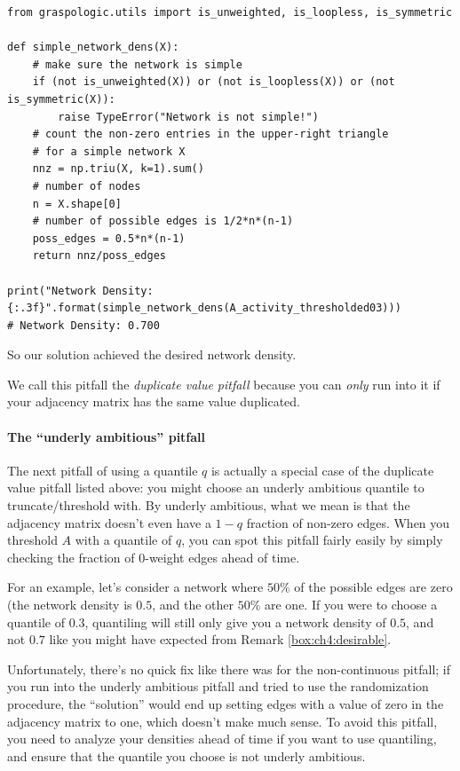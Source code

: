 \begin{lstlisting}[style=python]
from graspologic.utils import is_unweighted, is_loopless, is_symmetric

def simple_network_dens(X):
    # make sure the network is simple
    if (not is_unweighted(X)) or (not is_loopless(X)) or (not is_symmetric(X)):
        raise TypeError("Network is not simple!")
    # count the non-zero entries in the upper-right triangle
    # for a simple network X
    nnz = np.triu(X, k=1).sum()
    # number of nodes
    n = X.shape[0]
    # number of possible edges is 1/2*n*(n-1)
    poss_edges = 0.5*n*(n-1)
    return nnz/poss_edges

print("Network Density: {:.3f}".format(simple_network_dens(A_activity_thresholded03)))
# Network Density: 0.700
\end{lstlisting}

So our solution achieved the desired network density.

We call this pitfall the \emph{duplicate value pitfall} because you can \emph{only} run into it if your adjacency matrix has the same value duplicated.

\paragraph{The ``underly ambitious'' pitfall}

The next pitfall of using a quantile $q$ is actually a special case of the duplicate value pitfall listed above: you might choose an underly ambitious quantile to truncate/threshold with. By underly ambitious, what we mean is that the adjacency matrix doesn't even have a $1 - q$ fraction of non-zero edges. When you threshold $A$ with a quantile of $q$, you can spot this pitfall fairly easily by simply checking the fraction of $0$-weight edges ahead of time.

For an example, let's consider a network where $50\%$ of the possible edges are zero (the network density is $0.5$, and the other $50\%$ are one. If you were to choose a quantile of $0.3$, quantiling will still only give you a network density of $0.5$, and not $0.7$ like you might have expected from Remark \ref{box:ch4:desirable}.

Unfortunately, there's no quick fix like there was for the non-continuous pitfall; if you run into the underly ambitious pitfall and tried to use the randomization procedure, the ``solution'' would end up setting edges with a value of zero in the adjacency matrix to one, which doesn't make much sense. To avoid this pitfall, you need to analyze your densities ahead of time if you want to use quantiling, and ensure that the quantile you choose is not underly ambitious. 

